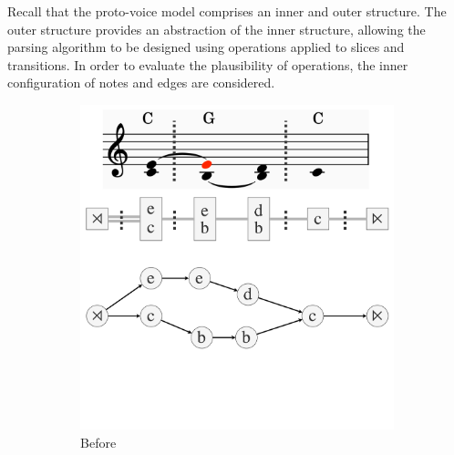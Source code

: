 \documentclass[12pt,a4paper,twoside,openany]{report} \usepackage[pdfborder={0 0 0}]{hyperref}    %
\theoremstyle{definition} \newtheorem{definition}{Definition}[section]
\begin{document}
  Recall that the proto-voice model comprises an inner and outer structure. The outer structure provides an abstraction
  of the inner structure, allowing the parsing algorithm to be designed using operations applied to slices and
  transitions. In order to evaluate the plausibility of operations, the inner configuration of notes and edges are considered.

  \begin{figure}[h] \centering \begin{subfigure}[t]{.49\textwidth}
    \centering\includegraphics[keepaspectratio,width=\textwidth]{impl/reduction/before.png} \caption{Before}
    \label{fig:reductionBefore} \end{subfigure} \begin{subfigure}[t]{.49\textwidth}

\end{subfigure}
\end{figure}
\end{document}
